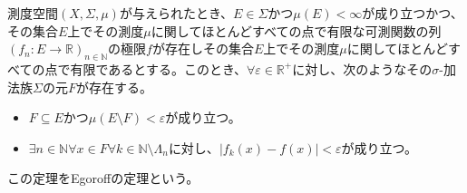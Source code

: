 \documentclass[dvipdfmx]{jsarticle}
\begin{document}
\begin{thm}[Egoroffの定理]\label{4.5.5.20}
測度空間$(X,\varSigma,\mu)$が与えられたとき、$E \in \varSigma$かつ$\mu(E) < \infty$が成り立つかつ、その集合$E$上でその測度$\mu$に関してほとんどすべての点で有限な可測関数の列$\left( f_{n}:E \rightarrow \mathbb{R} \right)_{n \in \mathbb{N}}$の極限$f$が存在しその集合$E$上でその測度$\mu$に関してほとんどすべての点で有限であるとする。このとき、$\forall\varepsilon \in \mathbb{R}^{+}$に対し、次のようなその$\sigma$-加法族$\varSigma$の元$F$が存在する。
\begin{itemize}
\item
  $F \subseteq E$かつ$\mu(E \setminus F) < \varepsilon$が成り立つ。
\item
  $\exists n \in \mathbb{N}\forall x \in F\forall k \in \mathbb{N} \setminus \varLambda_{n}$に対し、$\left| f_{k}(x) - f(x) \right| < \varepsilon$が成り立つ。
\end{itemize}
この定理をEgoroffの定理という。
\end{thm}
\end{document}
